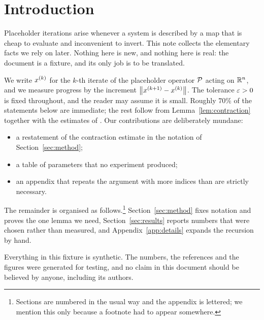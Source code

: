 \section{Introduction}
\label{sec:intro}

Placeholder iterations arise whenever a system is described by a map that is
cheap to evaluate and inconvenient to invert.  This note collects the
elementary facts we rely on later.  Nothing here is new, and nothing here is
real: the document is a fixture, and its only job is to be translated.

We write $x^{(k)}$ for the $k$-th iterate of the placeholder operator $\mathcal{P}$
acting on $\mathbb{R}^{n}$, and we measure progress by the increment
$\left\lVert x^{(k+1)} - x^{(k)} \right\rVert$.  The tolerance $\varepsilon > 0$ is fixed throughout,
and the reader may assume it is small.  Roughly $70\%$ of the statements below
are immediate; the rest follow from Lemma~\ref{lem:contraction} together with
the estimates of \cite{fixture2021}.
Our contributions are deliberately mundane:

\begin{itemize}
  \item a restatement of the contraction estimate in the notation of
        Section~\ref{sec:method};
  \item a table of parameters that no experiment produced;
  \item an appendix that repeats the argument with more indices than are
        strictly necessary.
\end{itemize}

The remainder is organised as follows.\footnote{Sections are numbered in the
usual way and the appendix is lettered; we mention this only because a
footnote had to appear somewhere.}  Section~\ref{sec:method} fixes notation and
proves the one lemma we need, Section~\ref{sec:results} reports numbers that
were chosen rather than measured, and Appendix~\ref{app:details} expands the
recursion by hand.

\begin{takeaway}
Everything in this fixture is synthetic.  The numbers, the references and the
figures were generated for testing, and no claim in this document should be
believed by anyone, including its authors.
\end{takeaway}
